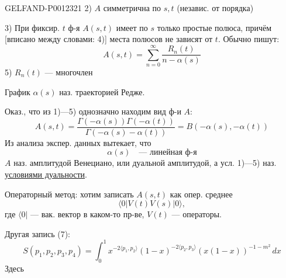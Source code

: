 \begin{GelfandAdjacentEvidence}{GELFAND-P001232}{1}
2) \(A\) симметрична по \(s,t\) (независ. от порядка)

3) При фиксир. \(t\) ф-я \(A(s,t)\) имеет по \(s\) только простые полюса,
причём [вписано между словами: 4)] места полюсов не зависят от \(t\). Обычно пишут:
\begin{equation*}
A(s,t)=\sum_{n=0}^{\infty}\frac{R_n(t)}{n-\alpha(s)}\tag{6}
\end{equation*}
5) \(R_n(t)\) --- многочлен

График \(\alpha(s)\) наз. траекторией Редже.

Оказ., что из 1)---5) однозначно находим вид ф-и \(A\):
\begin{equation*}
A(s,t)=\frac{\Gamma(-\alpha(s))\Gamma(-\alpha(t))}{\Gamma(-\alpha(s)-\alpha(t))}
=B(-\alpha(s),-\alpha(t))\tag{7}
\end{equation*}
Из анализа экспер. данных вытекает, что
\begin{equation*}
\alpha(s)\quad\text{--- линейная ф-я}\tag{8}
\end{equation*}
\(A\) наз. амплитудой Венециано, или дуальной амплитудой, а усл. 1)---5) наз. \underline{условиями дуальности}.

Операторный метод: хотим записать \(A(s,t)\) как опер. среднее
\begin{equation*}
\langle0|V(t)V(s)|0\rangle,\tag{9}
\end{equation*}
где \(\langle0|\) --- вак. вектор в каком-то пр-ве, \(V(t)\) --- операторы.

Другая запись (7):
\begin{equation*}
S(p_1,p_2,p_3,p_4)=\int_0^1
x^{-2\langle p_1,p_2\rangle}(1-x)^{-2\langle p_2,p_3\rangle}
(x(1-x))^{-1-m^2}\,dx\tag{10}
\end{equation*}
Здесь

\end{GelfandAdjacentEvidence}
